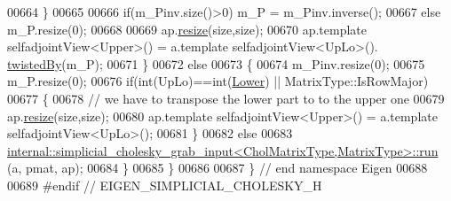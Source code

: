 \begin{DoxyCode}
00664     \}
00665 
00666     \textcolor{keywordflow}{if}(m\_Pinv.size()>0) m\_P = m\_Pinv.inverse();
00667     \textcolor{keywordflow}{else}                m\_P.resize(0);
00668     
00669     ap.\hyperlink{group___sparse_core___module_af88551f30202341b7cc24cfadabdec5c}{resize}(size,size);
00670     ap.template selfadjointView<Upper>() = a.template selfadjointView<UpLo>().
      \hyperlink{group___sparse_core___module_a51d4898bd6a57cc3ba543a39b102423e}{twistedBy}(m\_P);
00671   \}
00672   \textcolor{keywordflow}{else}
00673   \{
00674     m\_Pinv.resize(0);
00675     m\_P.resize(0);
00676     \textcolor{keywordflow}{if}(\textcolor{keywordtype}{int}(UpLo)==\textcolor{keywordtype}{int}(\hyperlink{group__enums_gga39e3366ff5554d731e7dc8bb642f83cda891792b8ed394f7607ab16dd716f60e6}{Lower}) || MatrixType::IsRowMajor)
00677     \{
00678       \textcolor{comment}{// we have to transpose the lower part to to the upper one}
00679       ap.\hyperlink{group___sparse_core___module_af88551f30202341b7cc24cfadabdec5c}{resize}(size,size);
00680       ap.template selfadjointView<Upper>() = a.template selfadjointView<UpLo>();
00681     \}
00682     \textcolor{keywordflow}{else}
00683       \hyperlink{struct_eigen_1_1internal_1_1simplicial__cholesky__grab__input}{internal::simplicial\_cholesky\_grab\_input<CholMatrixType,MatrixType>::run}
      (a, pmat, ap);
00684   \}  
00685 \}
00686 
00687 \} \textcolor{comment}{// end namespace Eigen}
00688 
00689 \textcolor{preprocessor}{#endif // EIGEN\_SIMPLICIAL\_CHOLESKY\_H}
\end{DoxyCode}

